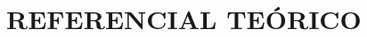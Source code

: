 \captionsetup{justification=centering,margin=0cm}

\chapter[REFERENCIAL TEÓRICO]{REFERENCIAL TEÓRICO}
\label{cap:referencial terórico}
